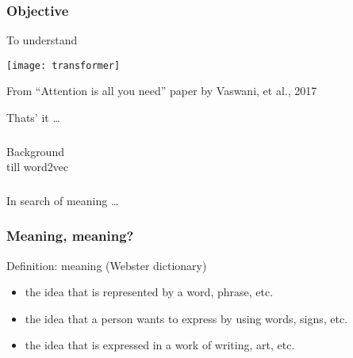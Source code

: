 \begin{frame}[fragile]\frametitle{Objective}

To understand

			\begin{center}
			\texttt{[image: transformer]}
			
			{\tiny From ``Attention is all you need'' paper by Vaswani, et al., 2017}
			\end{center}		

			Thats' it \ldots
			
\end{frame}


\begin{frame}[fragile]\frametitle{}
\begin{center}
{\Large Background}\\

{till word2vec}

\end{center}
\end{frame}

\begin{frame}[fragile]\frametitle{}
\begin{center}
{\Large In search of meaning \ldots}

\end{center}
\end{frame}

\begin{frame}[fragile]\frametitle{Meaning, meaning?}
Definition: meaning (Webster dictionary)

\begin{itemize}
\item the idea that is represented by a word, phrase, etc.
\item the idea that a person wants to express by using  words, signs, etc.
\item the idea that is expressed in a work of writing, art, etc.  
\end{itemize}




\end{frame}


